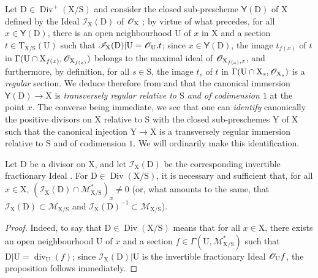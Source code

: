 \begin{env}[21.15.3.3]
\label{IV.21.15.3.3}
Let $\mathrm{D}\in\operatorname{Div}^+(\mathrm{X}/\mathrm{S})$ and consider the closed sub-prescheme $\boldsymbol{\mathsf{Y}}(\mathrm{D})$ of $\mathrm{X}$ defined by the Ideal $\mathscr I_{\mathrm{X}}(\mathrm{D})$ of $\mathscr{O}_{\mathrm{X}}$ ; by virtue of what precedes, for all $x\in\boldsymbol{\mathsf{Y}}(\mathrm{D})$, there is an open neighbourhood $\mathrm{U}$ of $x$ in $\mathrm{X}$ and a section $t\in\mathrm{T}_{\mathrm{X}/\mathrm{S}}(\mathrm{U})$ such that $\mathscr I_{\mathrm{X}}(\mathrm{D})|\mathrm{U}=\mathscr{O}_{\mathrm{U}}.t$; since $x\in\boldsymbol{\mathsf{Y}}(\mathrm{D})$, the image $t_{f(x)}$ of $t$ in $\Gamma(\mathrm{U}\cap\mathrm{X}_{f(x)},\mathscr{O}_{\mathrm{X}_{f(x)}})$ belongs to the maximal ideal of $\mathscr{O}_{\mathrm{X}_{f(x)},x}$, and furthermore, by definition, for all $s\in\mathrm{S}$, the image $t_s$ of $t$ in $\Gamma(\mathrm{U}\cap\mathrm{X}_s,\mathscr{O}_{\mathrm{X}_s})$ is a \emph{regular} section.
We deduce therefore from  and  that the canonical immersion $\boldsymbol{\mathsf{Y}}(\mathrm{D})\to\mathrm{X}$ is \emph{transversely regular relative to $\mathrm{S}$ and of codimension $1$} at the point $x$.
The converse being immediate, we see that one can \emph{identify} canonically the positive divisors on $\mathrm{X}$ relative to $\mathrm{S}$ with the closed sub-preschemes $\mathrm{Y}$ of $\mathrm{X}$ such that the canonical injection $\mathrm{Y}\to\mathrm{X}$ is a transversely regular immersion relative to $\mathrm{S}$ and of codimension $1$.
We will ordinarily make this identification.
\end{env}

\begin{proposition}[21.15.4]
\label{IV.21.15.4}
Let $\mathrm{D}$ be a divisor on $\mathrm{X}$, and let $\mathscr I_{\mathrm{X}}(\mathrm{D})$ be the corresponding invertible fractionary Ideal .
For $\mathrm{D}\in\operatorname{Div}(\mathrm{X}/\mathrm{S})$, it is necessary and sufficient that, for all $x\in\mathrm{X}$, $(\mathscr I_{\mathrm{X}}(\mathrm{D})\cap\mathscr{M}_{\mathrm{X}/\mathrm{S}}^*)_x\neq 0$ \textup{(}or, what amounts to the same, that $\mathscr I_{\mathrm{X}}(\mathrm{D})\subset\mathscr{M}_{\mathrm{X}/\mathrm{S}}$ and $\mathscr I_{\mathrm{X}}(\mathrm{D})^{-1}\subset\mathscr{M}_{\mathrm{X}/\mathrm{S}}$\textup{)}.
\end{proposition}

\begin{proof}
Indeed, to say that $\mathrm{D}\in\operatorname{Div}(\mathrm{X}/\mathrm{S})$ means that for all $x\in\mathrm{X}$, there exists an open neighbourhood $\mathrm{U}$ of $x$ and a section $f\in\Gamma(\mathrm{U},\mathscr{M}_{\mathrm{X}/\mathrm{S}}^*)$ such that $\mathrm{D}|\mathrm{U}=\operatorname{div}_{\mathrm{U}}(f)$; since $\mathscr I_{\mathrm{X}}(\mathrm{D})|\mathrm{U}$ is the invertible fractionary Ideal $\mathscr{O}_{\mathrm{U}}f$, the proposition follows immediately.
\end{proof}

